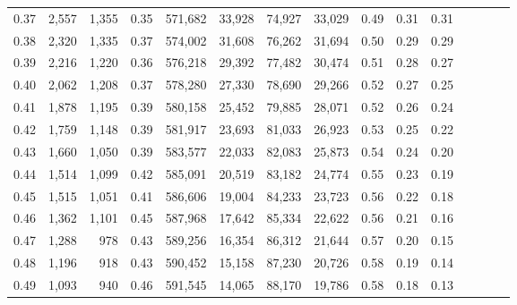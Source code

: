 \begin{tabular}{rrrcrrrrrrrrrrr}
0.37 &   2,557 &  1,355 &                                       0.35 &  571,682 &   33,928 &   74,927 &   33,029 &  0.49 &  0.31 &                         0.31 \\
0.38 &   2,320 &  1,335 &                                       0.37 &  574,002 &   31,608 &   76,262 &   31,694 &  0.50 &  0.29 &                         0.29 \\
0.39 &   2,216 &  1,220 &                                       0.36 &  576,218 &   29,392 &   77,482 &   30,474 &  0.51 &  0.28 &                         0.27 \\
0.40 &   2,062 &  1,208 &                                       0.37 &  578,280 &   27,330 &   78,690 &   29,266 &  0.52 &  0.27 &                         0.25 \\
0.41 &   1,878 &  1,195 &                                       0.39 &  580,158 &   25,452 &   79,885 &   28,071 &  0.52 &  0.26 &                         0.24 \\
0.42 &   1,759 &  1,148 &                                       0.39 &  581,917 &   23,693 &   81,033 &   26,923 &  0.53 &  0.25 &                         0.22 \\
0.43 &   1,660 &  1,050 &                                       0.39 &  583,577 &   22,033 &   82,083 &   25,873 &  0.54 &  0.24 &                         0.20 \\
0.44 &   1,514 &  1,099 &                                       0.42 &  585,091 &   20,519 &   83,182 &   24,774 &  0.55 &  0.23 &                         0.19 \\
0.45 &   1,515 &  1,051 &                                       0.41 &  586,606 &   19,004 &   84,233 &   23,723 &  0.56 &  0.22 &                         0.18 \\
0.46 &   1,362 &  1,101 &                                       0.45 &  587,968 &   17,642 &   85,334 &   22,622 &  0.56 &  0.21 &                         0.16 \\
0.47 &   1,288 &    978 &                                       0.43 &  589,256 &   16,354 &   86,312 &   21,644 &  0.57 &  0.20 &                         0.15 \\
0.48 &   1,196 &    918 &                                       0.43 &  590,452 &   15,158 &   87,230 &   20,726 &  0.58 &  0.19 &                         0.14 \\
0.49 &   1,093 &    940 &                                       0.46 &  591,545 &   14,065 &   88,170 &   19,786 &  0.58 &  0.18 &                         0.13 \\

\end{tabular}

